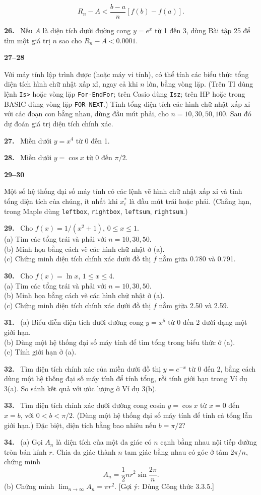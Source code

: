 \documentclass[12pt,a4paper]{article}
\newcommand{\bt}[1]{\par\smallskip\Needspace{5\baselineskip}\noindent\textbf{#1.}\ }
\newcommand{\group}[1]{\par\medskip\noindent\textbf{#1}\par\nopagebreak[4]}
\begin{document}
\[R_n-A<\frac{b-a}n[f(b)-f(a)].\]
\bt{26} Nếu $A$ là diện tích dưới đường cong $y=e^x$ từ 1 đến 3, dùng Bài tập 25 để tìm một giá trị $n$ sao cho $R_n-A<0.0001$.
\group{27–28} Với máy tính lập trình được (hoặc máy vi tính), có thể tính các biểu thức tổng diện tích hình chữ nhật xấp xỉ, ngay cả khi $n$ lớn, bằng vòng lặp. (Trên TI dùng lệnh \texttt{Is>} hoặc vòng lặp \texttt{For-EndFor}; trên Casio dùng \texttt{Isz}; trên HP hoặc trong BASIC dùng vòng lặp \texttt{FOR-NEXT}.) Tính tổng diện tích các hình chữ nhật xấp xỉ với các đoạn con bằng nhau, dùng đầu mút phải, cho $n=10,30,50,100$. Sau đó dự đoán giá trị diện tích chính xác.
\bt{27} Miền dưới $y=x^4$ từ 0 đến 1.
\bt{28} Miền dưới $y=\cos x$ từ 0 đến $\pi/2$.
\group{29–30} Một số hệ thống đại số máy tính có các lệnh vẽ hình chữ nhật xấp xỉ và tính tổng diện tích của chúng, ít nhất khi $x_i^*$ là đầu mút trái hoặc phải. (Chẳng hạn, trong Maple dùng \texttt{leftbox}, \texttt{rightbox}, \texttt{leftsum}, \texttt{rightsum}.)
\bt{29} Cho $f(x)=1/(x^2+1)$, $0\le x\le1$.\\(a) Tìm các tổng trái và phải với $n=10,30,50$.\\(b) Minh họa bằng cách vẽ các hình chữ nhật ở (a).\\(c) Chứng minh diện tích chính xác dưới đồ thị $f$ nằm giữa 0.780 và 0.791.
\bt{30} Cho $f(x)=\ln x$, $1\le x\le4$.\\(a) Tìm các tổng trái và phải với $n=10,30,50$.\\(b) Minh họa bằng cách vẽ các hình chữ nhật ở (a).\\(c) Chứng minh diện tích chính xác dưới đồ thị $f$ nằm giữa 2.50 và 2.59.
\bt{31} (a) Biểu diễn diện tích dưới đường cong $y=x^5$ từ 0 đến 2 dưới dạng một giới hạn.\\(b) Dùng một hệ thống đại số máy tính để tìm tổng trong biểu thức ở (a).\\(c) Tính giới hạn ở (a).
\bt{32} Tìm diện tích chính xác của miền dưới đồ thị $y=e^{-x}$ từ 0 đến 2, bằng cách dùng một hệ thống đại số máy tính để tính tổng, rồi tính giới hạn trong Ví dụ 3(a). So sánh kết quả với ước lượng ở Ví dụ 3(b).
\bt{33} Tìm diện tích chính xác dưới đường cong cosin $y=\cos x$ từ $x=0$ đến $x=b$, với $0<b<\pi/2$. (Dùng một hệ thống đại số máy tính để tính cả tổng lẫn giới hạn.) Đặc biệt, diện tích bằng bao nhiêu nếu $b=\pi/2$?
\bt{34} (a) Gọi $A_n$ là diện tích của một đa giác có $n$ cạnh bằng nhau nội tiếp đường tròn bán kính $r$. Chia đa giác thành $n$ tam giác bằng nhau có góc ở tâm $2\pi/n$, chứng minh
\[A_n=\frac12nr^2\sin\frac{2\pi}n.\]
(b) Chứng minh $\displaystyle\lim_{n\to\infty}A_n=\pi r^2$. [Gợi ý: Dùng Công thức 3.3.5.]
\end{document}
